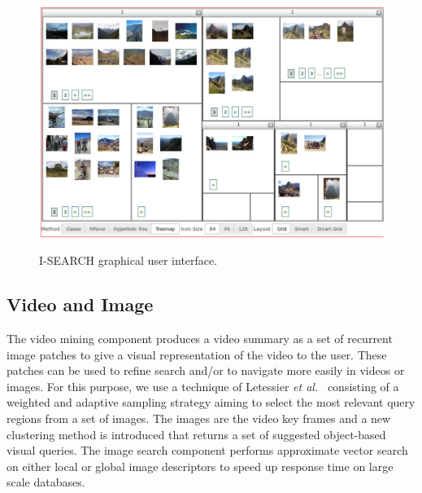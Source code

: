 \documentclass{www2012-comp-accepted}
\begin{document}
\begin{figure}
{      \includegraphics[width=0.72\columnwidth]{./resources/treemap.pdf}
      \label{fig:treemap}}      
\caption{\mbox{I-SEARCH} graphical user interface.}
\label{fig:gui}
\end{figure}

\subsection{Video and Image}
The video mining component produces a video summary as a set of recurrent image patches to give a visual representation of the video to the user.
These patches can be used to refine search and/or to navigate more easily in videos or images.
For this purpose, we use a technique of Letessier \textit{et al.}~\cite{Letessier11} consisting of a weighted and adaptive sampling strategy aiming to select the most relevant query regions from a set of images.
The images are the video key frames and a new clustering method is introduced that returns a set of suggested object-based visual queries. The image search component performs approximate vector search on either local or global image descriptors to speed up response time on large scale databases.
\end{document}

